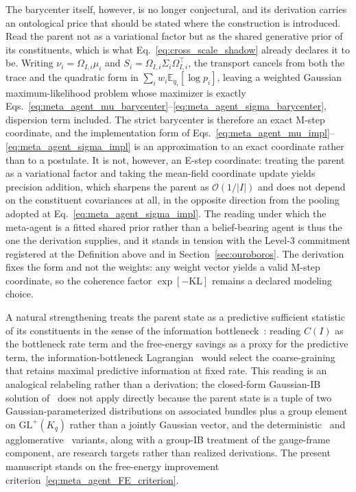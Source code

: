 \documentclass[11pt]{article}
\begin{document}
The barycenter itself, however, is no longer conjectural, and its derivation carries an ontological price that should be stated where the construction is introduced. Read the parent not as a variational factor but as the shared generative prior of its constituents, which is what Eq.~\eqref{eq:cross_scale_shadow} already declares it to be. Writing $\nu_i = \Omega_{I,i}\mu_i$ and $S_i = \Omega_{I,i}\Sigma_i\Omega_{I,i}^\top$, the transport cancels from both the trace and the quadratic form in $\sum_i w_i \mathbb{E}_{q_i}[\log p_i]$, leaving a weighted Gaussian maximum-likelihood problem whose maximizer is exactly Eqs.~\eqref{eq:meta_agent_mu_barycenter}--\eqref{eq:meta_agent_sigma_barycenter}, dispersion term included. The strict barycenter is therefore an exact M-step coordinate, and the implementation form of Eqs.~\eqref{eq:meta_agent_mu_impl}--\eqref{eq:meta_agent_sigma_impl} is an approximation to an exact coordinate rather than to a postulate. It is not, however, an E-step coordinate: treating the parent as a variational factor and taking the mean-field coordinate update yields precision addition, which sharpens the parent as $\mathcal{O}(1/|I|)$ and does not depend on the constituent covariances at all, in the opposite direction from the pooling adopted at Eq.~\eqref{eq:meta_agent_sigma_impl}. The reading under which the meta-agent is a fitted shared prior rather than a belief-bearing agent is thus the one the derivation supplies, and it stands in tension with the Level-3 commitment registered at the Definition above and in Section~\ref{sec:ouroboros}. The derivation fixes the form and not the weights: any weight vector yields a valid M-step coordinate, so the coherence factor $\exp[-\mathrm{KL}]$ remains a declared modeling choice.

A natural strengthening treats the parent state as a predictive sufficient statistic of its constituents in the sense of the information bottleneck~\cite{tishby1999information}: reading $C(I)$ as the bottleneck rate term and the free-energy savings as a proxy for the predictive term, the information-bottleneck Lagrangian~\cite{bialek2001predictability} would select the coarse-graining that retains maximal predictive information at fixed rate. This reading is an analogical relabeling rather than a derivation; the closed-form Gaussian-IB solution of~\cite{chechik2005information} does not apply directly because the parent state is a tuple of two Gaussian-parameterized distributions on associated bundles plus a group element on $\mathrm{GL}^+(K_q)$ rather than a jointly Gaussian vector, and the deterministic~\cite{StrouseSchwab2017} and agglomerative~\cite{SlonimTishby2000} variants, along with a group-IB treatment of the gauge-frame component, are research targets rather than realized derivations. The present manuscript stands on the free-energy improvement criterion~\eqref{eq:meta_agent_FE_criterion}.
\end{document}
